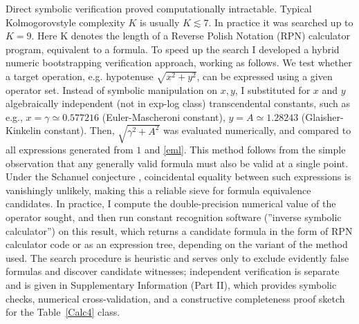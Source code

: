 \documentclass[12pt]{article}
\begin{document}
Direct symbolic verification proved computationally intractable. Typical Kolmogorov\text{-}style complexity $K$ \cite{Kolmogorov1965} is usually $K \lesssim 7$. In practice it was searched up to $K=9$. Here K denotes the length of a Reverse Polish Notation (RPN) calculator program, equivalent to a formula. To speed up the search I developed a hybrid numeric bootstrapping verification approach, working as follows. We test whether a target operation, e.g. hypotenuse $\sqrt{x^2+y^2}$, can be expressed using a given operator set. Instead of symbolic manipulation on $x,y$, I substituted for $x$ and $y$ algebraically independent (not in exp-log class) transcendental constants, such as e.g., $x=\gamma \simeq 0.577216$ (Euler-Mascheroni constant), $y = A \simeq 1.28243$ (Glaisher-Kinkelin constant). 
Then, $\sqrt{\gamma^2+A^2}$ was evaluated numerically, and compared to all expressions generated from $1$ and \eqref{eml}. This method follows from the simple observation that any generally valid formula must also be valid at a single point. Under the Schanuel conjecture \cite{SchanuelTerzo}, coincidental equality between such expressions is vanishingly unlikely, making this a reliable sieve for formula equivalence candidates. In practice, I compute the double-precision numerical value of the operator sought, and then run constant recognition software (''inverse symbolic calculator'') on this result, which returns a candidate formula in the form of RPN calculator code \cite{SymbolicRegressionPackage} or as an expression tree, depending on the variant of the method used. 
The search procedure is heuristic and serves only to exclude evidently false formulas and discover candidate witnesses; independent verification is separate and is given in Supplementary Information (Part II), which provides symbolic checks, numerical cross-validation, and a constructive completeness proof sketch for the Table~\ref{Calc4} class.
\end{document}
